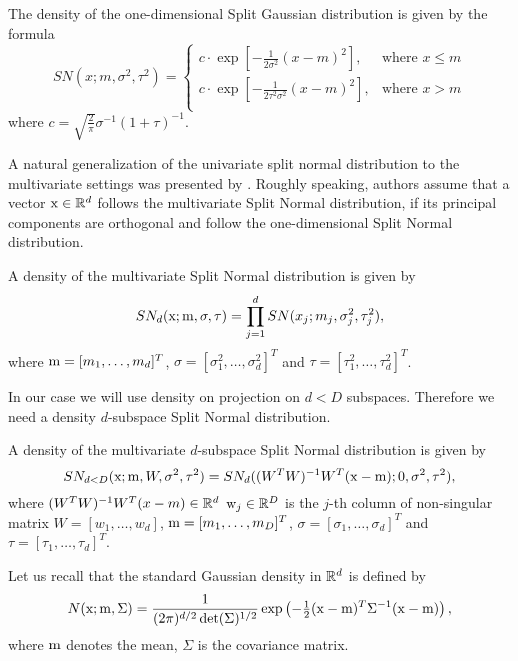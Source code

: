 

 The density of the one-dimensional Split Gaussian distribution is given by the formula
$$
SN(x;m,\sigma^2,\tau^2) = \left\{ \begin{array}{ll}
c \cdot \exp[-\frac{1}{2\sigma^2}(x-m)^2], & \textrm{where $x\leq m$}\\
c \cdot \exp[-\frac{1}{2\tau^2\sigma^2}(x-m)^2], & \textrm{where $x>m$}\\
\end{array} \right.
$$
where $c=\sqrt{\frac{2}{\pi}}\sigma^{-1}(1+\tau)^{-1}$. 

A natural generalization of the univariate split normal distribution to the multivariate settings was presented by \cite{villani2006multivariate}.
Roughly speaking, authors assume that a vector $\mathrm{x} \in \mathbb{R}^d$ follows the multivariate Split Normal distribution, if its principal components are orthogonal and follow the one-dimensional Split Normal distribution.

\begin{definition}\label{def:SN}
A density of the multivariate Split Normal distribution is given by
$$
 SN_{d}(\mathrm{x}; \mathrm{m}, \sigma,\tau)= \prod_{j=1}^{d} SN(x_j;m_j,\sigma_j^2,\tau_j^2),
$$
where  $\mathrm{m} = [m_1, \ldots, m_d]^T$, $\sigma = [\sigma_{1}^2,\ldots,\sigma_{d}^2]^T$ and $\tau=[\tau_{1}^2,\ldots,\tau_{d}^2]^T$.
\end{definition}


In our case we will use density on projection on $d<D$ subspaces. Therefore we need a density $d$-subspace Split Normal distribution.

\begin{definition}\label{def:GSN}
A density of the multivariate $d$-subspace Split Normal distribution is given by
$$
 SN_{d<D}(\mathrm{x}; \mathrm{m},W, \sigma^2,\tau^2)=  SN_d((W^TW)^{-1}W^T(\mathrm{x}-\mathrm{m});0,\sigma^2,\tau^2),
$$
where
$(W^TW)^{-1}W^T(x-m) \in \mathbb{R}^d$
 $\mathrm{w}_{j} \in \mathbb{R}^D$ is the $j$-th column of non-singular matrix $W = [w_{1},\ldots,w_{d}]$, $\mathrm{m} = [m_1, \ldots, m_D]^T$, $\sigma = [\sigma_{1},\ldots,\sigma_{d}]^T$ and $\tau=[\tau_{1},\ldots,\tau_{d}]^T$.
\end{definition}

Let us recall that the standard Gaussian density in $\mathbb{R}^d$ is defined by 
$$
N(\mathrm{x};\mathrm{m},\Sigma)=\frac{1}{(2\pi)^{d/2} \det(\Sigma)^{1/2}} \exp \left(-\tfrac{1}{2} (\mathrm{x}-\mathrm{m})^T \Sigma^{-1}(\mathrm{x}-\mathrm{m}) \right),
$$
where $\mathrm{m}$ denotes the mean, $\Sigma$ is the covariance matrix.

